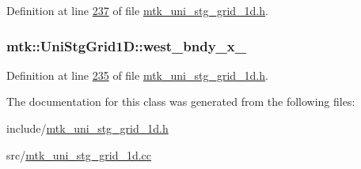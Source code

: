 Definition at line \hyperlink{mtk__uni__stg__grid__1d_8h_source_l00237}{237} of file \hyperlink{mtk__uni__stg__grid__1d_8h_source}{mtk\+\_\+uni\+\_\+stg\+\_\+grid\+\_\+1d.\+h}.

\hypertarget{classmtk_1_1UniStgGrid1D_a6910438d3396d0b9a130d11d16979c46}{
\subsubsection[{west\+\_\+bndy\+\_\+x\+\_\+}]{ mtk\+::\+Uni\+Stg\+Grid1\+D\+::west\+\_\+bndy\+\_\+x\+\_\+\hspace{0.3cm}{\ttfamily [private]}}}\label{classmtk_1_1UniStgGrid1D_a6910438d3396d0b9a130d11d16979c46}


Definition at line \hyperlink{mtk__uni__stg__grid__1d_8h_source_l00235}{235} of file \hyperlink{mtk__uni__stg__grid__1d_8h_source}{mtk\+\_\+uni\+\_\+stg\+\_\+grid\+\_\+1d.\+h}.



The documentation for this class was generated from the following files\+:\begin{DoxyCompactItemize}
\item 
include/\hyperlink{mtk__uni__stg__grid__1d_8h}{mtk\+\_\+uni\+\_\+stg\+\_\+grid\+\_\+1d.\+h}\item 
src/\hyperlink{mtk__uni__stg__grid__1d_8cc}{mtk\+\_\+uni\+\_\+stg\+\_\+grid\+\_\+1d.\+cc}\end{DoxyCompactItemize}
